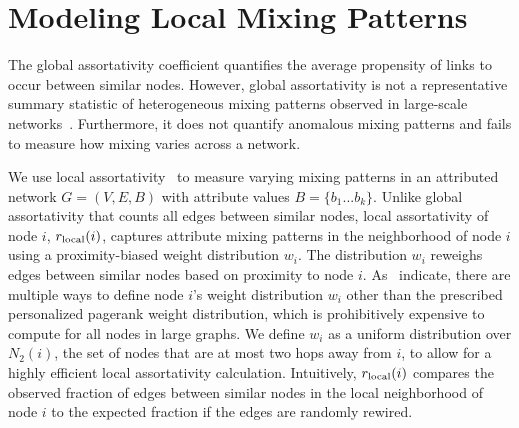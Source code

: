 \section{Modeling Local Mixing Patterns}
\label{subsec:LocalMixing}

The global assortativity coefficient quantifies
the average propensity of links to occur between similar nodes.
However, global assortativity is not a representative summary statistic of
heterogeneous mixing patterns observed in large-scale networks~\cite{peel2018multiscale}.
Furthermore, it does not quantify anomalous mixing patterns and fails to measure how mixing varies across a network.

We use local assortativity~\cite{peel2018multiscale} to measure varying
mixing patterns in an attributed network $G=(V,E,B)$ with attribute values $B=\{b_1...b_k\}$.
Unlike global assortativity that counts all edges between similar nodes, local assortativity
of node $i$, $r_{\scriptsize\mbox{local}}(i)$, captures attribute mixing patterns in the neighborhood of node
$i$ using a proximity-biased weight distribution $w_i$. The distribution
$w_i$ reweighs edges between similar nodes based on proximity to
node $i$. As~\citet{peel2018multiscale} indicate, there are multiple ways
to define node $i$'s weight distribution $w_i$ other than the prescribed
personalized pagerank weight distribution, which is prohibitively expensive to compute
for all nodes in large graphs.
We define $w_i$ as a uniform distribution over $N_2(i)$, the set of nodes that
are at most two hops away from $i$, to allow for a highly efficient
local assortativity calculation.
Intuitively, $r_{\scriptsize\mbox{local}}(i)$ compares the observed fraction of edges between similar nodes
in the local neighborhood of node $i$ to the expected fraction
if the edges are randomly rewired.

